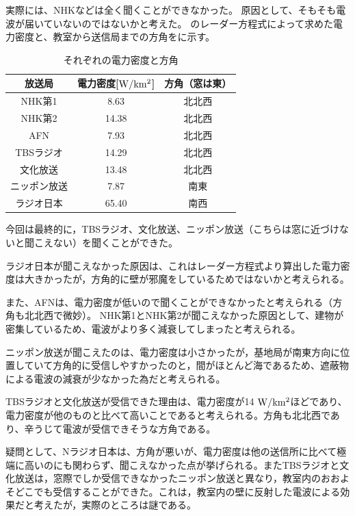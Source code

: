 \documentclass[report.tex]{subfiles}
\begin{document}
実際には、NHKなどは全く聞くことができなかった。
原因として、そもそも電波が届いていないのではないかと考えた。
のレーダー方程式によって求めた電力密度と、教室から送信局までの方角をに示す。

\begin{table}[H]
	\centering
	\caption{それぞれの電力密度と方角}
	\label{tab:aaa}
	\begin{tabular}{ccc} \hline
		放送局    & 電力密度[\(\rm{W/km^2}\)] & 方角（窓は東） \\ \hline
		NHK第1  & 8.63                  & 北北西     \\
		NHK第2  & 14.38                 & 北北西     \\
		AFN    & 7.93                  & 北北西     \\
		TBSラジオ & 14.29                 & 北北西     \\
		文化放送   & 13.48                 & 北北西     \\
		ニッポン放送 & 7.87                  & 南東      \\
		ラジオ日本  & 65.40                 & 南西      \\ \hline
	\end{tabular}
\end{table}

今回は最終的に，TBSラジオ、文化放送、ニッポン放送（こちらは窓に近づけないと聞こえない）を聞くことができた。

ラジオ日本が聞こえなかった原因は、これはレーダー方程式より算出した電力密度は大きかったが，方角的に壁が邪魔をしているためではないかと考えられる。

また、AFNは、電力密度が低いので聞くことができなかったと考えられる（方角も北北西で微妙）。
NHK第1とNHK第2が聞こえなかった原因として、建物が密集しているため、電波がより多く減衰してしまったと考えられる。

ニッポン放送が聞こえたのは、電力密度は小さかったが，基地局が南東方向に位置していて方角的に受信しやすかったのと，間がほとんど海であるため、遮蔽物による電波の減衰が少なかった為だと考えられる。

TBSラジオと文化放送が受信できた理由は、電力密度が14 \(\rm{W/km^2}\)ほどであり、電力密度が他のものと比べて高いことであると考えられる。方角も北北西であり、辛うじて電波が受信できそうな方角である。

疑問として、Nラジオ日本は、方角が悪いが、電力密度は他の送信所に比べて極端に高いのにも関わらず、聞こえなかった点が挙げられる。またTBSラジオと文化放送は，窓際でしか受信できなかったニッポン放送と異なり，教室内のおおよそどこでも受信することができた。これは，教室内の壁に反射した電波による効果だと考えたが，実際のところは謎である。
\end{document}
